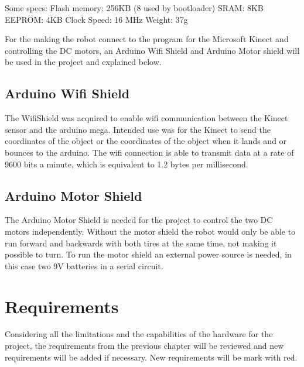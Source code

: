 Some specs:\newline
Flash memory: 256KB (8 used by bootloader)\newline
SRAM: 8KB\newline
EEPROM: 4KB\newline
Clock Speed: 16 MHz\newline
Weight: 37g

For the making the robot connect to the program for the Microsoft Kinect and controlling the DC motors, an Arduino Wifi Shield and Arduino Motor shield will be used in the project and explained below.

\subsection{Arduino Wifi Shield}
\label{sec: Arduino Wifi Shield}
The WifiShield was acquired to enable wifi communication between the Kinect sensor and the arduino mega. Intended use was for the Kinect to send the coordinates of the object or the coordinates of the object when it lands and or bounces to the arduino. The wifi connection is able to transmit data at a rate of 9600 bits a minute, which is equivalent to 1.2 bytes per millisecond. 
\citep{aws}

\subsection{Arduino Motor Shield}
\label{sec:Arduino Motor Shield}
The Arduino Motor Shield is needed for the project to control the two DC motors independently. Without the motor shield the robot would only be able to run forward and backwards with both tires at the same time, not making it possible to turn. 
To run the motor shield an external power source is needed, in this case two 9V batteries in a serial circuit. \citep{ams}

\section{Requirements}
\label{sec:HWrequirements}
Considering all the limitations and the capabilities of the hardware for the project, the requirements from the previous chapter will be reviewed and new requirements will be added if necessary. New requirements will be mark with red. 

